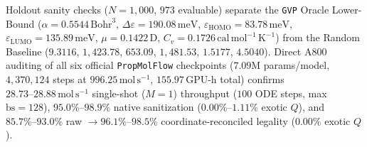 \documentclass[11pt,a4paper]{article}
\begin{document}
Holdout sanity checks ($N=1{,}000$, $973$ evaluable) separate the \texttt{GVP} Oracle Lower-Bound ($\alpha=0.5544\,\text{Bohr}^3$, $\Delta\varepsilon=190.08\,\text{meV}$, $\varepsilon_{\text{HOMO}}=83.78\,\text{meV}$, $\varepsilon_{\text{LUMO}}=135.89\,\text{meV}$, $\mu=0.1422\,\text{D}$, $C_v=0.1726\,\text{cal}\,\text{mol}^{-1}\,\text{K}^{-1}$) from the Random Baseline ($9.3116$, $1{,}423.78$, $653.09$, $1{,}481.53$, $1.5177$, $4.5040$). Direct A800 auditing of all six official \texttt{PropMolFlow} checkpoints ($7.09\text{M}$ params/model, $4{,}370{,}124$ steps at $996.25\,\text{mol}\,\text{s}^{-1}$, $155.97\,\text{GPU-h}$ total) confirms $28.73\text{--}28.88\,\text{mol}\,\text{s}^{-1}$ single-shot ($M=1$) throughput ($100$ ODE steps, max $\text{bs}=128$), $95.0\%\text{--}98.9\%$ native sanitization ($0.00\%\text{--}1.11\%$ exotic $Q$), and $85.7\%\text{--}93.0\%$ raw $\to 96.1\%\text{--}98.5\%$ coordinate-reconciled legality ($0.00\%$ exotic $Q$).
\end{document}
